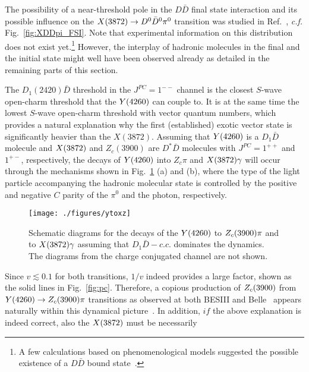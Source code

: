 The possibility of a near-threshold pole in the $D\bar D$ final state
interaction and its possible influence on the $X(3872)\to D^0\bar D^0\pi^0$
transition was studied in Ref.~\cite{Guo:2014hqa}, {\sl c.f.}
Fig.~\ref{fig:XDDpi_FSI}. Note that experimental information on this
distribution does not exist yet.\footnote{A few calculations based on
phenomenological models suggested the possible existence of a $D\bar D$ bound
state~\cite{Wong:2003xk,Zhang:2006ix,FernandezCarames:2009zz,Zhang:2009vs,
Liu:2010xh,Li:2012mqa}.} However, the interplay of hadronic molecules in the
final and the initial state might well have been observed already as detailed in
the remaining parts of this section.

The $D_1(2420)\bar D$ threshold in the $J^{PC}=1^{--}$ channel is the closest
$S$-wave open-charm threshold that the $Y(4260)$ can couple to. It is at the same
time the lowest $S$-wave open-charm threshold with vector quantum numbers, which
provides a natural explanation why the first (established) exotic vector state
is significantly heavier than the $X(3872)$.
Assuming that $Y(4260)$ is a  $D_1\bar D$ molecule and $X(3872)$ and $Z_c(3900)$ are
$D^*\bar D$ molecules with $J^{PC}=1^{++}$ and $1^{+-}$, respectively, the
decays of $Y(4260)$ into  $Z_c\pi$ and $X(3872)\gamma$ will occur through the mechanisms
shown in Fig.~\ref{fig:ytoxz} (a) and (b), where the type of the light particle
accompanying the hadronic molecular state is controlled by the positive and
negative $C$ parity of the $\pi^0$ and the photon, respectively.
  \begin{figure}[tb]
    \begin{center}
     \texttt{[image: ./figures/ytoxz]}\\
     \caption{Schematic diagrams for the decays of the $Y(4260)$ to $Z_c(3900)\pi$ and
to $X(3872)\gamma$ assuming that $D_1 \bar D-c.c.$ dominates the dynamics. The
diagrams from the charge conjugated channel are not shown.
     \label{fig:ytoxz}}
    \end{center}
  \end{figure}
Since $v\lesssim 0.1$ for both transitions, $1/v$ indeed provides a large
factor, shown as the solid lines in Fig.~\ref{fig:pc}. Therefore,  a copious
production of $Z_c(3900)$ from  $Y(4260)\to Z_c(3900) \pi$ transitions as observed at both BESIII
and Belle~\cite{Ablikim:2013mio,Liu:2013dau} appears naturally within this
dynamical picture~\cite{Wang:2013cya}.
In addition, $if$ the above explanation is indeed correct, also the $X(3872)$ must be necessarily
